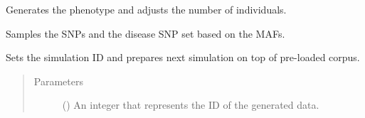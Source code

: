 \documentclass[a4paper,10pt,english]{sphinxhowto}
\begin{document}
\begin{fulllineitems}
\begin{fulllineitems}
\end{fulllineitems}


\begin{fulllineitems}
\label{\detokenize{utils:utils.data_simulator.DataSimulator.generate_phenotype}}
Generates the phenotype and adjusts the number of individuals.

\end{fulllineitems}


\begin{fulllineitems}
\label{\detokenize{utils:utils.data_simulator.DataSimulator.sample_snps}}
Samples the SNPs and the disease SNP set based on the MAFs.

\end{fulllineitems}


\begin{fulllineitems}
\label{\detokenize{utils:utils.data_simulator.DataSimulator.set_sim_id}}
Sets the simulation ID and prepares next simulation on top of pre-loaded corpus.
\begin{quote}\begin{description}
\item[{Parameters}] \leavevmode
{} () \textendash{} An integer that represents the ID of the generated data.

\end{description}\end{quote}

\end{fulllineitems}


\end{fulllineitems}
\end{document}
